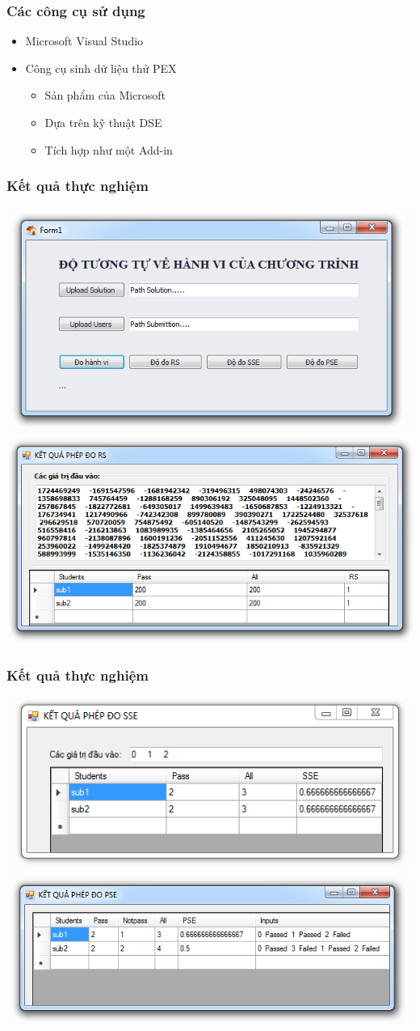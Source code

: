 \documentclass{beamer}
\begin{document}
\begin{frame}
  \frametitle{Các công cụ sử dụng}
  \begin{itemize}
  	\item Microsoft Visual Studio
  	\item Công cụ sinh dữ liệu thử PEX
  	\begin{itemize}
  		\item Sản phẩm của Microsoft
  		\item Dựa trên kỹ thuật DSE
  		\item Tích hợp như một Add-in
  	\end{itemize}
  \end{itemize}
\end{frame}


\begin{frame}
  \frametitle{Kết quả thực nghiệm}
  \centering
  \includegraphics[width=0.6\linewidth]{images/main.png} \\
  \includegraphics[width=0.6\linewidth]{images/kq_rs.png}
\end{frame}

\begin{frame}
\frametitle{Kết quả thực nghiệm}
\centering
\includegraphics[width=0.8\linewidth]{images/kq_sse.png} \\
\includegraphics[width=0.8\linewidth]{images/kq_pse.png}
\end{frame}
\end{document}
